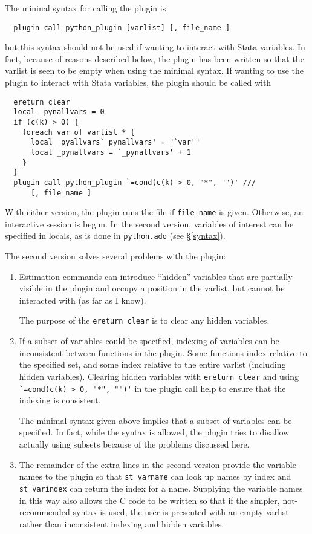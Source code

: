 \documentclass{article}
\begin{document}
	The mininal syntax for calling the plugin is
	{\small
	\begin{lstlisting}
  plugin call python_plugin [varlist] [, file_name ]
	\end{lstlisting}}
	
	\noindent but this syntax should not be used if wanting to interact with Stata variables. In fact, because of reasons described below, the plugin has been written so that the varlist is seen to be empty when using the minimal syntax. If wanting to use the plugin to interact with Stata variables, the plugin should be called with 
	{\small
	\begin{lstlisting}
  ereturn clear
  local _pynallvars = 0
  if (c(k) > 0) {
    foreach var of varlist * {
      local _pyallvars`_pynallvars' = "`var'"
      local _pynallvars = `_pynallvars' + 1
    }
  }
  plugin call python_plugin `=cond(c(k) > 0, "*", "")' ///
      [, file_name ]
	\end{lstlisting}}
	
	With either version, the plugin runs the file if \lstinline{file_name} is given. Otherwise, an interactive session is begun. In the second version, variables of interest can be specified in locals, as is done in \lstinline{python.ado} (see \S\ref{syntax}).
	
	The second version solves several problems with the plugin:
	\begin{enumerate}
		\item Estimation commands can introduce ``hidden'' variables that are partially visible in the plugin and occupy a position in the varlist, but cannot be interacted with (as far as I know).
		
		The purpose of the \lstinline{ereturn clear} is to clear any hidden variables.
		
		\item If a subset of variables could be specified, indexing of variables can be inconsistent between functions in the plugin. Some functions index relative to the specified set, and some index relative to the entire varlist (including hidden variables). Clearing hidden variables with \lstinline{ereturn clear} and using \lstinline{`=cond(c(k) > 0, "*", "")'} in the plugin call help to ensure that the indexing is consistent.
		
		The minimal syntax given above implies that a subset of variables can be specified. In fact, while the syntax is allowed, the plugin tries to disallow actually using subsets because of the problems discussed here.
		
		\item The remainder of the extra lines in the second version provide the variable names to the plugin so that \lstinline{st_varname} can look up names by index and \lstinline{st_varindex} can return the index for a name. Supplying the variable names in this way also allows the C code to be written so that if the simpler, not-recommended syntax is used, the user is presented with an empty varlist rather than inconsistent indexing and hidden variables.
	\end{enumerate}
	
\end{document}
